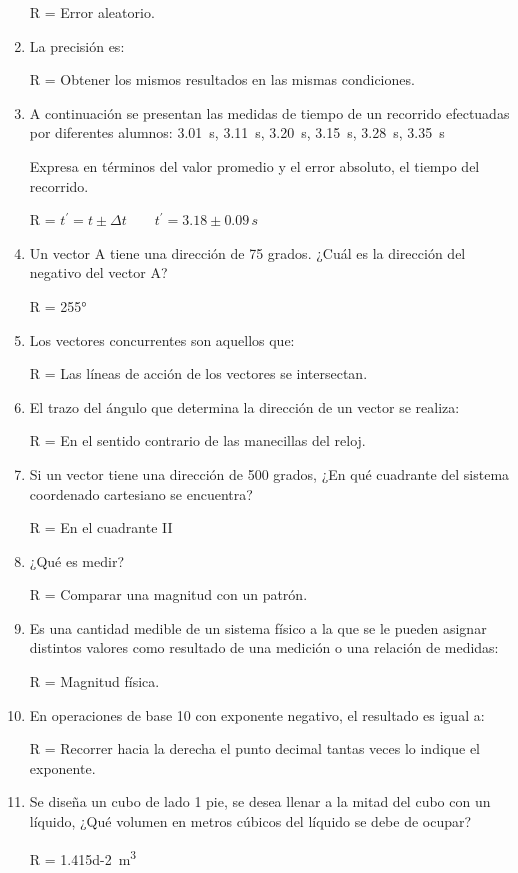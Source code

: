\documentclass[14pt]{extarticle}
\begin{document}
\begin{enumerate}
R = Error aleatorio.

\item La precisión es:

R = Obtener los mismos resultados en las mismas condiciones.

\item  A continuación se presentan las medidas de tiempo de un recorrido efectuadas por diferentes alumnos:
\SI{3.01}{\second}, \SI{3.11}{\second}, \SI{3.20}{\second}, \SI{3.15}{\second}, \SI{3.28}{\second}, \SI{3.35}{\second}

Expresa en términos del valor promedio y el error absoluto, el tiempo del recorrido.

R = $t^{\prime} = t \pm \Delta t \quad \quad t^{\prime} = 3.18 \pm 0.09 \, s$

\item Un vector A tiene una dirección de 75 grados. ¿Cuál es la dirección del negativo del vector A?

R = \ang{255}
\item Los vectores concurrentes son aquellos que:

R = Las líneas de acción de los vectores se intersectan.
\item El trazo del ángulo que determina la dirección de un vector se realiza:

R = En el sentido contrario de las manecillas del reloj.

\item Si un vector tiene una dirección de 500 grados, ¿En qué cuadrante del sistema coordenado cartesiano se encuentra?

R = En el cuadrante II

\item ¿Qué es medir?

R = Comparar una magnitud con un patrón.

\item Es una cantidad medible de un sistema físico a la que se le pueden asignar distintos valores como resultado de una medición o una relación de medidas:

R = Magnitud física.

\item En operaciones de base 10 con exponente negativo, el resultado es igual a:

R = Recorrer hacia la derecha el punto decimal tantas veces lo indique el exponente.

\item Se diseña un cubo de lado 1 pie, se desea llenar a la mitad del cubo con un líquido, ¿Qué volumen en metros cúbicos del líquido se debe de ocupar?

R = \SI{1.415d-2}{\cubic\meter}
\end{enumerate}
\end{document}
